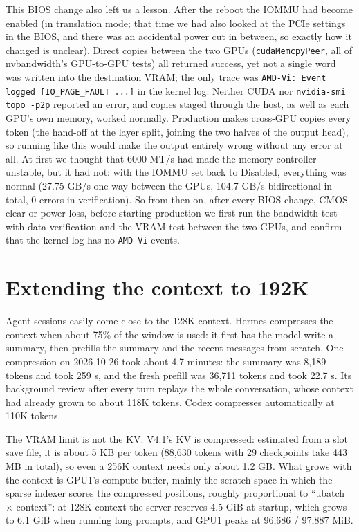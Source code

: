 \documentclass[11pt,a4paper]{article}
\newcommand{\code}[1]{\texttt{#1}}
\begin{document}
This BIOS change also left us a lesson. After the reboot the IOMMU had become enabled (in translation mode; that time we had also looked at the PCIe settings in the BIOS, and there was an accidental power cut in between, so exactly how it changed is unclear). Direct copies between the two GPUs (\code{cudaMemcpyPeer}, all of nvbandwidth's GPU-to-GPU tests) all returned success, yet not a single word was written into the destination VRAM; the only trace was \code{AMD-Vi: Event logged [IO\_PAGE\_FAULT ...]} in the kernel log. Neither CUDA nor \code{nvidia-smi topo -p2p} reported an error, and copies staged through the host, as well as each GPU's own memory, worked normally. Production makes cross-GPU copies every token (the hand-off at the layer split, joining the two halves of the output head), so running like this would make the output entirely wrong without any error at all. At first we thought that 6000 MT/s had made the memory controller unstable, but it had not: with the IOMMU set back to Disabled, everything was normal (27.75 GB/s one-way between the GPUs, 104.7 GB/s bidirectional in total, 0 errors in verification). So from then on, after every BIOS change, CMOS clear or power loss, before starting production we first run the bandwidth test with data verification and the VRAM test between the two GPUs, and confirm that the kernel log has no \code{AMD-Vi} events.

\section{Extending the context to 192K}
\label{sec:ctx}

Agent sessions easily come close to the 128K context. Hermes compresses the context when about 75\% of the window is used: it first has the model write a summary, then prefills the summary and the recent messages from scratch. One compression on 2026-10-26 took about 4.7 minutes: the summary was 8,189 tokens and took 259 s, and the fresh prefill was 36,711 tokens and took 22.7 s. Its background review after every turn replays the whole conversation, whose context had already grown to about 118K tokens. Codex compresses automatically at 110K tokens.

The VRAM limit is not the KV. V4.1's KV is compressed: estimated from a slot save file, it is about 5 KB per token (88,630 tokens with 29 checkpoints take 443 MB in total), so even a 256K context needs only about 1.2 GB. What grows with the context is GPU1's compute buffer, mainly the scratch space in which the sparse indexer scores the compressed positions, roughly proportional to ``ubatch × context'': at 128K context the server reserves 4.5 GiB at startup, which grows to 6.1 GiB when running long prompts, and GPU1 peaks at 96,686 / 97,887 MiB.
\end{document}
